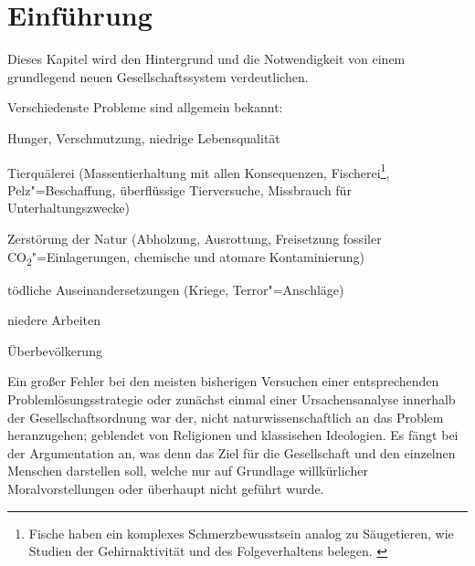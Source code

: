 \chapter{Einführung}\label{chap:introduction}

Dieses Kapitel wird den Hintergrund und die Notwendigkeit von einem grundlegend neuen Gesellschaftssystem verdeutlichen.

Verschiedenste Probleme sind allgemein bekannt:
\medskip
\begin{compactitem}
\item Hunger, Verschmutzung, niedrige Lebensqualität
\item Tierquälerei (Massentierhaltung mit allen Konsequenzen, Fischerei\footnote{Fische haben ein komplexes Schmerzbewusstsein analog zu Säugetieren, wie Studien der Gehirnaktivität und des Folgeverhaltens belegen. \citep{spiegel_10_2011}}, Pelz"=Beschaffung, überflüssige Tierversuche, Missbrauch für Unterhaltungszwecke)
\item Zerstörung der Natur (Abholzung, Ausrottung, Freisetzung fossiler CO\textsubscript{2}"=Einlagerungen, chemische und atomare Kontaminierung)
\item tödliche Auseinandersetzungen (Kriege, Terror"=Anschläge)
\item niedere Arbeiten
\item Überbevölkerung
\end{compactitem}
\medskip

Ein großer Fehler bei den meisten bisherigen Versuchen einer entsprechenden Problemlösungsstrategie oder zunächst einmal einer Ursachensanalyse innerhalb der Gesellschaftsordnung war der, nicht naturwissenschaftlich an das Problem heranzugehen; geblendet von Religionen und klassischen Ideologien. Es fängt bei der Argumentation an, was denn das Ziel für die Gesellschaft und den einzelnen Menschen darstellen soll, welche nur auf Grundlage willkürlicher Moralvorstellungen oder überhaupt nicht geführt wurde.
